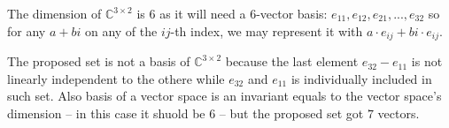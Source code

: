 \documentclass[11pt]{article}
\begin{document}
The dimension of $\mathbb{C}^{3 \times 2}$ is $6$ as it will need a 6-vector basis: $e_{11}, e_{12}, e_{21}, ... , e_{32}$ so for any $a + bi$ on any of the $ij$-th index, we may represent it with $a \cdot e_{ij} + bi \cdot e_{ij}$.

The proposed set is not a basis of $\mathbb{C}^{3 \times 2}$ because the last element $e_{32} - e_{11}$ is not linearly independent to the othere while $e_{32}$ and $e_{11}$ is individually included in such set. Also basis of a vector space is an invariant equals to the vector space's dimension -- in this case it shuold be $6$ -- but the proposed set got $7$ vectors.
\end{document}
